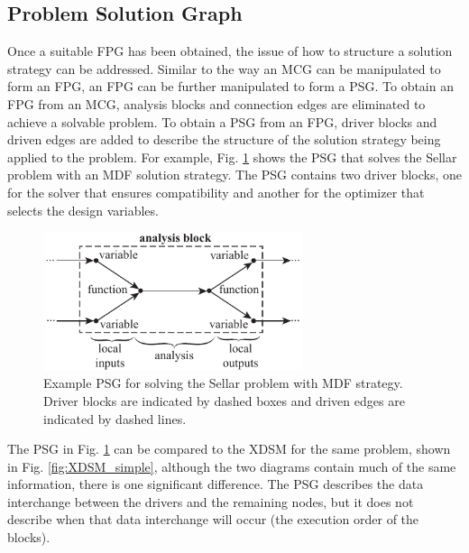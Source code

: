 \subsection{Problem Solution Graph}
Once a suitable FPG has been obtained, the issue of how to structure a solution strategy 
can be addressed. Similar to the way an MCG can be manipulated to form an FPG, an FPG can be
further manipulated to form a PSG. To obtain an FPG from an MCG, analysis blocks and
connection edges are eliminated to achieve a solvable problem. To obtain a PSG from an FPG, 
driver blocks and driven edges are added to describe the structure of the solution strategy being applied 
to the problem. For example, Fig. \ref{f:sellar_psg} shows the PSG that solves the Sellar problem 
with an MDF solution strategy. The PSG contains two driver blocks, one for the solver that 
ensures compatibility and another for the optimizer that selects the design variables. 
\begin{figure}[htb]
    \begin{center}
    \includegraphics[width=3.0in]{images/sellar_mdf_psg}
    \end{center}
    \vspace{-10pt}
    \caption{Example PSG for solving the Sellar problem with MDF strategy. 
    Driver blocks are indicated by dashed boxes and driven edges are indicated by dashed lines.}
    \label{f:sellar_psg}
\end{figure}

The PSG in Fig. \ref{f:sellar_psg} can be compared to the XDSM for the same problem, shown 
in Fig. \ref{fig:XDSM_simple}, although the two diagrams contain much of the same information, 
there is one significant difference. The PSG describes the data interchange between 
the drivers and the remaining nodes, but it does not describe when that data interchange 
will occur (the execution order of the blocks). 

